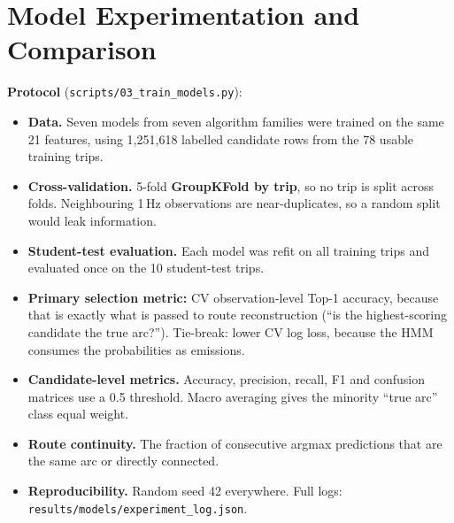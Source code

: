 \documentclass[10pt,a4paper]{article}
\newcommand{\code}[1]{\texttt{\small #1}}
\begin{document}
\section{Model Experimentation and Comparison}
\textbf{Protocol} (\code{scripts/03\_train\_models.py}):
\begin{itemize}
  \item \textbf{Data.} Seven models from seven algorithm families were trained on the same 21 features, using 1{,}251{,}618 labelled candidate rows from the 78 usable training trips.
  \item \textbf{Cross-validation.} 5-fold \textbf{GroupKFold by trip}, so no trip is split across folds. Neighbouring 1\,Hz observations are near-duplicates, so a random split would leak information.
  \item \textbf{Student-test evaluation.} Each model was refit on all training trips and evaluated once on the 10 student-test trips.
  \item \textbf{Primary selection metric:} CV observation-level Top-1 accuracy, because that is exactly what is passed to route reconstruction (``is the highest-scoring candidate the true arc?''). Tie-break: lower CV log loss, because the HMM consumes the probabilities as emissions.
  \item \textbf{Candidate-level metrics.} Accuracy, precision, recall, F1 and confusion matrices use a 0.5 threshold. Macro averaging gives the minority ``true arc'' class equal weight.
  \item \textbf{Route continuity.} The fraction of consecutive argmax predictions that are the same arc or directly connected.
  \item \textbf{Reproducibility.} Random seed 42 everywhere. Full logs: \code{results/models/experiment\_log.json}.
\end{itemize}
\end{document}
